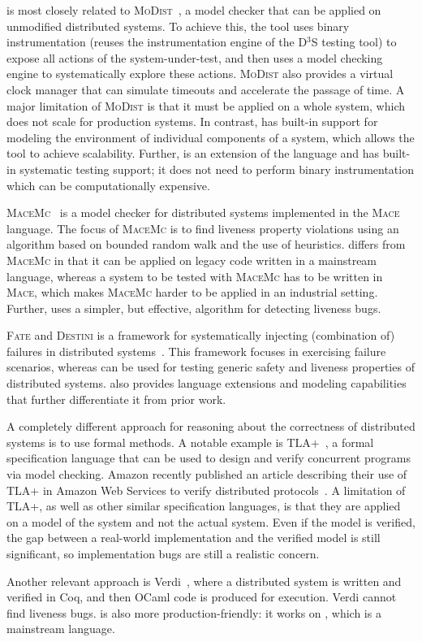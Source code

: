 \psharp is most closely related to \textsc{MoDist}~\cite{yang2009modist}, a model checker that can be applied on unmodified distributed systems. To achieve this, the tool uses binary instrumentation (reuses the instrumentation engine of the D$^3$S testing tool) to expose all actions of the system-under-test, and then uses a model checking engine to systematically explore these actions. \textsc{MoDist} also provides a virtual clock manager that can simulate timeouts and accelerate the passage of time. A major limitation of \textsc{MoDist} is that it must be applied on a whole system, which does not scale for production systems. In contrast, \psharp has built-in support for modeling the environment of individual components of a system, which allows the tool to achieve scalability. Further, \psharp is an extension of the \csharp language and has built-in systematic testing support; it does not need to perform binary instrumentation which can be computationally expensive.

\textsc{MaceMc}~\cite{killian2007life} is a model checker for distributed systems implemented in the \textsc{Mace} language. The focus of \textsc{MaceMc} is to find liveness property violations using an algorithm based on bounded random walk and the use of heuristics. \psharp differs from \textsc{MaceMc} in that it can be applied on legacy code written in a mainstream language, whereas a system to be tested with \textsc{MaceMc} has to be written in \textsc{Mace}, which makes \textsc{MaceMc} harder to be applied in an industrial setting. Further, \psharp uses a simpler, but effective, algorithm for detecting liveness bugs.

\textsc{Fate} and \textsc{Destini} is a framework for systematically injecting (combination of) failures in distributed systems~\cite{gunawi2011fate}. This framework focuses in exercising failure scenarios, whereas \psharp can be used for testing generic safety and liveness properties of distributed systems. \psharp also provides language extensions and modeling capabilities that further differentiate it from prior work.

A completely different approach for reasoning about the correctness of distributed systems is to use formal methods.  A notable example is TLA+~\cite{lamport1994temporal}, a formal specification language that can be used to design and verify concurrent programs via model checking. Amazon recently published an article describing their use of TLA+ in Amazon Web Services to verify distributed protocols~\cite{newcombe2015aws}. A limitation of TLA+, as well as other similar specification languages, is that they are applied on a model of the system and not the actual system. Even if the model is verified, the gap between a real-world implementation and the verified model is still significant, so implementation bugs are still a realistic concern.

Another relevant approach is Verdi~\cite{wilcox2015verdi}, where a distributed system is written and verified in Coq, and then OCaml code is produced for execution. Verdi cannot find liveness bugs. \psharp is also more production-friendly: it works on \csharp, which is a mainstream language.
